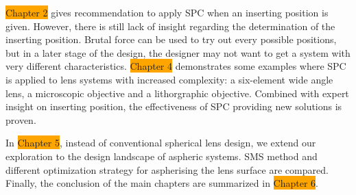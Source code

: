 \colorbox{orange}{Chapter 2} gives recommendation to apply SPC when an inserting position is given. However, there is still lack of insight regarding the determination of the inserting position. Brutal force can be used to try out every possible positions, but in a later stage of the design, the designer may not want to get a system with very different characteristics. \colorbox{orange}{Chapter 4} demonstrates some examples where SPC is applied to lens systems with increased complexity: a six-element wide angle lens, a microscopic objective and a lithorgraphic objective. Combined with expert insight on inserting position, the effectiveness of SPC providing new solutions is proven. 

In \colorbox{orange}{Chapter 5}, instead of conventional spherical lens design, we extend our exploration to the design landscape of aspheric systems. SMS method and different optimization strategy for aspherising the lens surface are compared. Finally, the conclusion of the main chapters are summarized in \colorbox{orange}{Chapter 6}.

